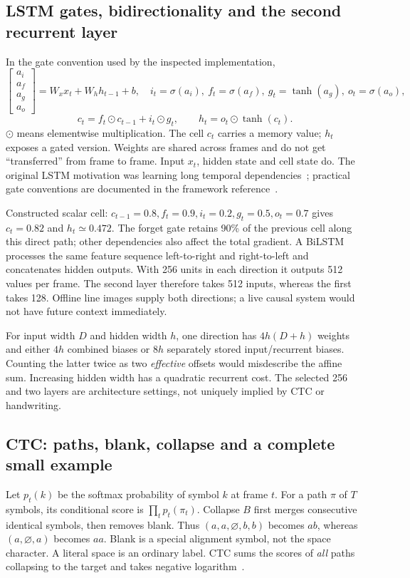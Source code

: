 \subsection{LSTM gates, bidirectionality and the second recurrent layer}
In the gate convention used by the inspected implementation,
\[
\begin{bmatrix}a_i\\a_f\\a_g\\a_o\end{bmatrix}
=W_xx_t+W_hh_{t-1}+b,\quad
i_t=\sigma(a_i),\ f_t=\sigma(a_f),\ g_t=\tanh(a_g),\ o_t=\sigma(a_o),
\]
\[
c_t=f_t\odot c_{t-1}+i_t\odot g_t,\qquad
h_t=o_t\odot\tanh(c_t).
\]
$\odot$ means elementwise multiplication. The cell $c_t$ carries a memory
value; $h_t$ exposes a gated version. Weights are shared across frames and
do not get ``transferred'' from frame to frame. Input $x_t$, hidden state
and cell state do. The original LSTM motivation was learning long temporal
dependencies~\cite{hochreiter1997}; practical gate conventions are documented
in the framework reference~\cite{torchlstm}.

Constructed scalar cell: $c_{t-1}=0.8,f_t=0.9,i_t=0.2,g_t=0.5,o_t=0.7$
gives $c_t=0.82$ and $h_t\simeq0.472$. The forget gate retains 90\% of
the previous cell along this direct path; other dependencies also affect the
total gradient. A BiLSTM processes the same feature sequence left-to-right
and right-to-left and concatenates hidden outputs. With 256 units in each
direction it outputs 512 values per frame. The second layer therefore takes
512 inputs, whereas the first takes 128. Offline line images supply both
directions; a live causal system would not have future context immediately.

For input width $D$ and hidden width $h$, one direction has
$4h(D+h)$ weights and either $4h$ combined biases or $8h$ separately stored
input/recurrent biases. Counting the latter twice as two \emph{effective}
offsets would misdescribe the affine sum. Increasing hidden width has a
quadratic recurrent cost. The selected 256 and two layers are architecture
settings, not uniquely implied by CTC or handwriting.

\subsection{CTC: paths, blank, collapse and a complete small example}
Let $p_t(k)$ be the softmax probability of symbol $k$ at frame $t$.
For a path $\pi$ of $T$ symbols, its conditional score is
$\prod_t p_t(\pi_t)$. Collapse $B$ first merges consecutive identical
symbols, then removes blank. Thus $(a,a,\varnothing,b,b)$ becomes $ab$,
whereas $(a,\varnothing,a)$ becomes $aa$. Blank is a special alignment
symbol, not the space character. A literal space is an ordinary label.
CTC sums the scores of \emph{all} paths collapsing to the target and takes
negative logarithm~\cite{graves2006}.

